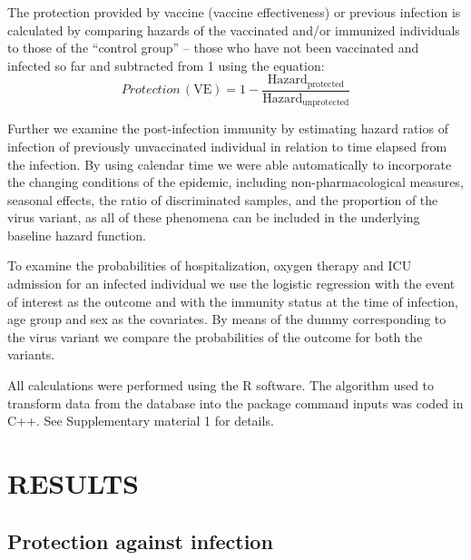 \documentclass[a4paper,12pt]{article}
\begin{document}
The protection provided by vaccine (vaccine effectiveness) or previous infection is calculated by comparing hazards of the vaccinated and/or immunized individuals to those of the  ``control group'' -- those who have not been vaccinated and infected so far and subtracted from 1 using the equation:
\begin{equation}
Protection\, (\mbox{VE}) = 1 -  \frac{\mathrm{Hazard_{protected}}}{\mathrm{Hazard_{unprotected}}}
\label{eq1}
\end{equation}

Further we examine the post-infection immunity by estimating hazard ratios of infection of previously unvaccinated individual in relation to time elapsed from the infection. By using calendar time we were able automatically to incorporate the changing conditions of the epidemic, including non-pharmacological measures, seasonal effects, the ratio of discriminated samples, and the proportion of the virus variant, as all of these phenomena can be included in the underlying baseline hazard function. 

To examine the probabilities of hospitalization, oxygen therapy and ICU admission for an infected individual we use the logistic regression with the event of interest as the outcome and with the immunity status at the time of infection, age group and sex as the covariates. By means of the dummy corresponding to the virus variant we compare the probabilities of the outcome for both the variants. %

 
All calculations were performed using the R software. The algorithm used to transform data from the database into the package command inputs was coded in C++. See Supplementary material 1 for details. 



\section*{RESULTS}
\label{sec3}

\subsection*{Protection against infection}
\end{document}
